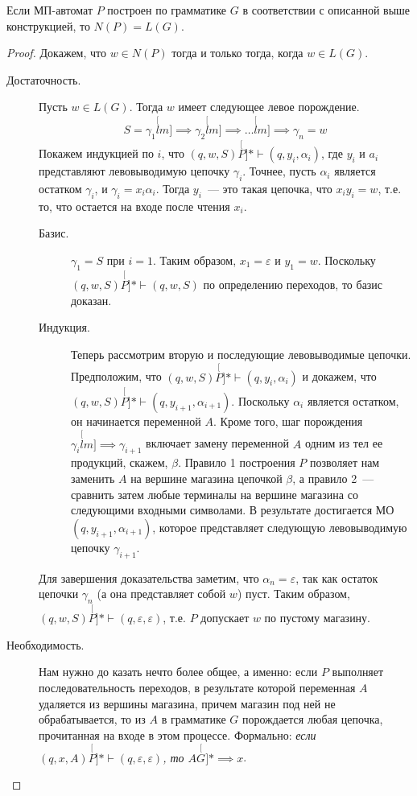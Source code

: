 \documentclass[a4paper,12pt]{article}
\begin{document}
\begin{theorem}
	Если МП-автомат $P$ построен по грамматике $G$ в соответствии с описанной выше конструкцией, то $N(P) = L(G)$.
\end{theorem}
\begin{proof}
	Докажем, что  $w \in N(P)$ тогда и только тогда, когда $w \in L(G)$.
	\begin{description}
		\item[Достаточность.] Пусть $w \in L(G)$. Тогда $w$ имеет следующее левое порождение.
		\[S = \gamma_1 \stackrel[lm]{}{\implies} \gamma_2 \stackrel[lm]{}{\implies} \ldots \stackrel[lm]{}{\implies} \gamma_n = w\]
		Покажем индукцией по $i$, что $(q, w, S) \stackrel[P]{*}{\vdash} (q, y_i, \alpha_i)$, где $y_i$ и $a_i$ представляют левовыводимую цепочку $\gamma_i$. Точнее, пусть $\alpha_i$ является остатком $\gamma_i$, и $\gamma_i = x_i \alpha_i$. Тогда $y_i$~--- это такая цепочка, что $x_i y_i = w$, т.е. то, что остается на входе после чтения $x_i$.
		
		\begin{description}
			\item[Базис.] $\gamma_1 = S$ при $i = 1$. Таким образом, $x_1 = \varepsilon$ и $y_1 = w$. Поскольку $(q, w, S) \stackrel[P]{*}{\vdash} (q, w, S)$ по определению переходов, то базис доказан.
			
			\item[Индукция.] Теперь рассмотрим вторую и последующие левовыводимые цепочки. Предположим, что $(q, w, S) \stackrel[P]{*}{\vdash} (q, y_i, \alpha_i)$ и докажем, что $(q, w, S) \stackrel[P]{*}{\vdash} (q, y_{i + 1}, \alpha_{i + 1})$. Поскольку $\alpha_i$ является остатком, он начинается переменной $A$. Кроме того, шаг порождения $\gamma_{i} \stackrel[lm]{}{\implies} \gamma_{i + 1}$ включает замену переменной $A$ одним из тел ее продукций, скажем, $\beta$. Правило 1 построения $P$ позволяет нам заменить $A$ на вершине магазина цепочкой $\beta$, а правило 2~--- сравнить затем любые терминалы на вершине магазина со следующими входными символами. В результате достигается МО $(q, y_{i +1}, \alpha_{i + 1})$, которое представляет следующую левовыводимую цепочку $\gamma_{i + 1}$.
		\end{description}
		Для завершения доказательства заметим, что $\alpha_n = \varepsilon$, так как остаток цепочки $\gamma_n$ (а она представляет собой $w$) пуст. Таким образом, $(q, w, S) \stackrel[P]{*}{\vdash} (q, \varepsilon, \varepsilon)$, т.е. $P$ допускает $w$ по пустому магазину.
		
		\item[Необходимость.] Нам нужно до казать нечто более общее, а именно: если $P$ выполняет последовательность переходов, в результате которой переменная $A$ удаляется из вершины магазина, причем магазин под ней не обрабатывается, то из $A$ в грамматике $G$ порождается любая цепочка, прочитанная на входе в этом процессе. Формально: \emph{если $(q, x, A) \stackrel[P]{*}{\vdash} (q, \varepsilon, \varepsilon)$, то $A \stackrel[G]{*}{\implies} x$}.
		

\end{description}
\end{proof}
\end{document}
